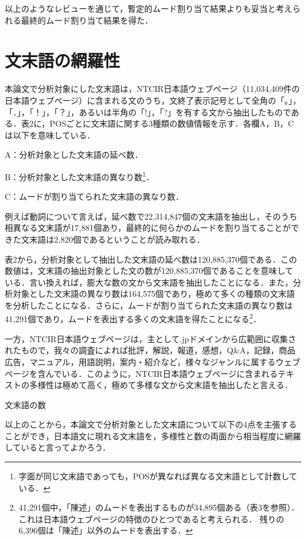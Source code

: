 \documentclass[japanese]{jnlp_1.4}
\begin{document}
以上のようなレビューを通じて，暫定的ムード割り当て結果よりも妥当と考えられる最終的ムード割り当て結果を得た．




\section{文末語の網羅性}

本論文で分析対象にした文末語は，NTCIR日本語ウェブページ（11,034,409件の日本語ウェブページ）に含まれる文のうち，文終了表示記号として全角の「。」，「．」，「！」，「？」，あるいは半角の「!」，「?」を有する文から抽出したものである．表2に，POSごとに文末語に関する3種類の数値情報を示す．各欄A，B，Cは以下を意味している．

A：分析対象とした文末語の延べ数．

B：分析対象とした文末語の異なり数\footnote{
	字面が同じ文末語であっても，POSが異なれば異なる文末語として計数している．}．

C：ムードが割り当てられた文末語の異なり数．

例えば動詞について言えば，延べ数で22,314,847個の文末語を抽出し，そのうち相異なる文末語が17,881個あり，最終的に何らかのムードを割り当てることができた文末語は2,820個であるということが読み取れる．

表2から，分析対象として抽出した文末語の延べ数は120,885,370個である．この数値は，文末語の抽出対象とした文の数が120,885,370個であることを意味している．言い換えれば，膨大な数の文から文末語を抽出したことになる．また，分析対象とした文末語の異なり数は164,575個であり，極めて多くの種類の文末語を分析したことになる．さらに，ムードが割り当てられた文末語の異なり数は41,291個であり，ムードを表出する多くの文末語を得たことになる\footnote{
	41,291個中，「陳述」のムードを表出するものが34,895個ある（表3を参照）．
	これは日本語ウェブページの特徴のひとつであると考えられる．
	残りの6,396個は「陳述」以外のムードを表出する．}．

一方，NTCIR日本語ウェブページは，主として.jpドメインから広範囲に収集されたもので，我々の調査によれば批評，解説，報道，感想，Q{\&}A，記録，商品広告，マニュアル，用語説明，案内・紹介など，様々なジャンルに属するウェブページを含んでいる．このように，NTCIR日本語ウェブページに含まれるテキストの多様性は極めて高く，極めて多様な文から文末語を抽出したと言える．

\begin{table}[t]
\caption{文末語の数}

\end{table}

以上のことから，本論文で分析対象とした文末語について以下の4点を主張することができ，日本語文に現れる文末語を，多様性と数の両面から相当程度に網羅していると言ってよかろう．
\end{document}
